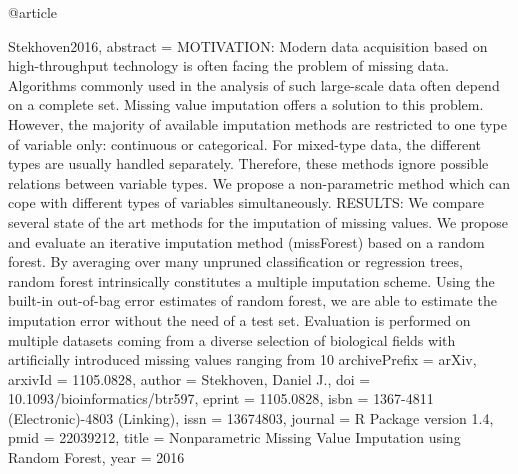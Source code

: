 {{{@article{Stekhoven2016,
abstract = {MOTIVATION: Modern data acquisition based on high-throughput technology is often facing the problem of missing data. Algorithms commonly used in the analysis of such large-scale data often depend on a complete set. Missing value imputation offers a solution to this problem. However, the majority of available imputation methods are restricted to one type of variable only: continuous or categorical. For mixed-type data, the different types are usually handled separately. Therefore, these methods ignore possible relations between variable types. We propose a non-parametric method which can cope with different types of variables simultaneously. RESULTS: We compare several state of the art methods for the imputation of missing values. We propose and evaluate an iterative imputation method (missForest) based on a random forest. By averaging over many unpruned classification or regression trees, random forest intrinsically constitutes a multiple imputation scheme. Using the built-in out-of-bag error estimates of random forest, we are able to estimate the imputation error without the need of a test set. Evaluation is performed on multiple datasets coming from a diverse selection of biological fields with artificially introduced missing values ranging from 10%
archivePrefix = {arXiv},
arxivId = {1105.0828},
author = {Stekhoven, Daniel J.},
doi = {10.1093/bioinformatics/btr597},
eprint = {1105.0828},
isbn = {1367-4811 (Electronic)-4803 (Linking)},
issn = {13674803},
journal = {R Package version 1.4},
pmid = {22039212},
title = {{Nonparametric Missing Value Imputation using Random Forest}},
year = {2016}
}

}}}}
